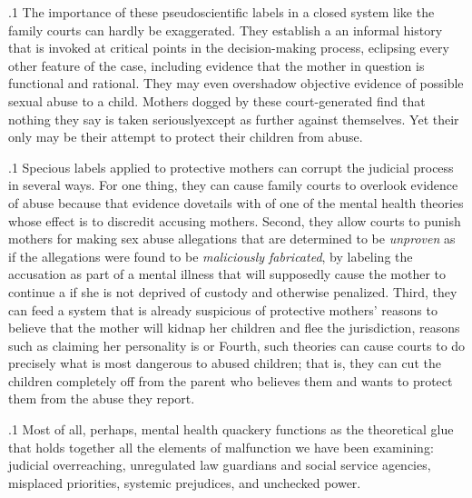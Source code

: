 \documentclass[11pt, twoside]{article}
\begin{document}
{\p.1{%
The importance of these pseudoscientific labels in a closed system
like the family courts can hardly be exaggerated. They establish a \mdash{}an informal history that is invoked at critical points in
the decision-making process, eclipsing every other feature of the case,
including evidence that the mother in question is functional and rational. They may even overshadow objective evidence of possible sexual
abuse to a child. Mothers dogged by these court-generated  find that nothing they say is taken seriously\mdash{}except as further
 against themselves. Yet their only  may be their
attempt to protect their children from abuse.
}%

\p.1{%
Specious  labels applied to protective mothers can
corrupt the judicial process in several ways. For one thing, they can
cause family courts to overlook evidence of abuse because that evidence dovetails with  of one of the mental health theories whose effect is to discredit accusing mothers. Second, they allow
courts to punish mothers for making sex abuse allegations that are
determined to be \textit{unproven} as if the allegations were
found to be \textit{maliciously fabricated}, by labeling
the accusation as part of a mental illness
that will supposedly cause the mother to continue a  if she is not deprived of custody and otherwise penalized.
Third, they can feed a system that is already suspicious of protective
mothers’  reasons to believe that the mother will kidnap her children and flee the jurisdiction, reasons such as claiming
her personality is  or  Fourth, such theories can
cause courts to do precisely what is most dangerous to abused children; that is, they can cut the children completely off from the parent
who believes them and wants to protect them from the abuse they
report.
}%

\p.1{%
Most of all, perhaps, mental health quackery functions as the theoretical glue that holds together all the elements of malfunction we have
been examining: judicial overreaching, unregulated law guardians and
social service agencies, misplaced priorities, systemic prejudices, and
unchecked power.
}%

}
\end{document}
